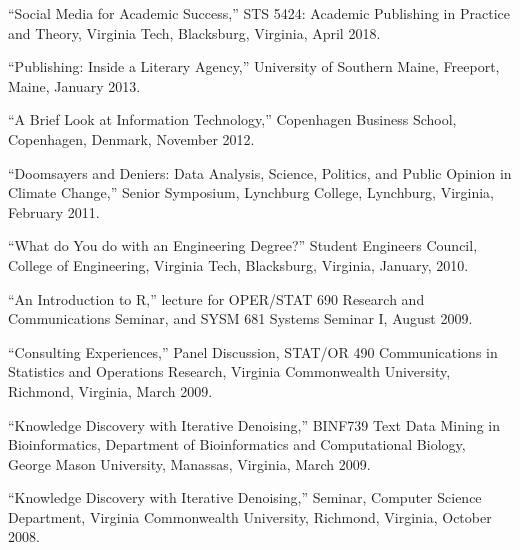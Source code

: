 \documentclass[11pt,article,oneside]{memoir}
\begin{document}






 
 \bigskip

\medskip

\ind “Social Media for Academic Success,” STS 5424: Academic Publishing in Practice and Theory, Virginia Tech, Blacksburg, Virginia, April 2018.

\ind “Publishing: Inside a Literary Agency,” University of Southern Maine, Freeport, Maine, January 2013.

\ind “A Brief Look at Information Technology,” Copenhagen Business School, Copenhagen, Denmark, November 2012.

\ind “Doomsayers and Deniers: Data Analysis, Science, Politics, and Public Opinion in Climate Change,” Senior Symposium, Lynchburg College, Lynchburg, Virginia, February 2011.

\ind “What do You do with an Engineering Degree?” Student Engineers Council, College of Engineering, Virginia Tech, Blacksburg, Virginia, January, 2010.

\ind “An Introduction to R,” lecture for OPER/STAT 690 Research and Communications Seminar, and SYSM 681 Systems Seminar I, August 2009.

\ind “Consulting Experiences,” Panel Discussion, STAT/OR 490 Communications in Statistics and Operations Research, Virginia Commonwealth University, Richmond, Virginia, March 2009.

\ind “Knowledge Discovery with Iterative Denoising,” BINF739 Text Data Mining in Bioinformatics, Department of Bioinformatics and Computational Biology, George Mason University, Manassas, Virginia, March 2009.

\ind “Knowledge Discovery with Iterative Denoising,” Seminar, Computer Science Department, Virginia Commonwealth University, Richmond, Virginia, October 2008.
\end{document}
